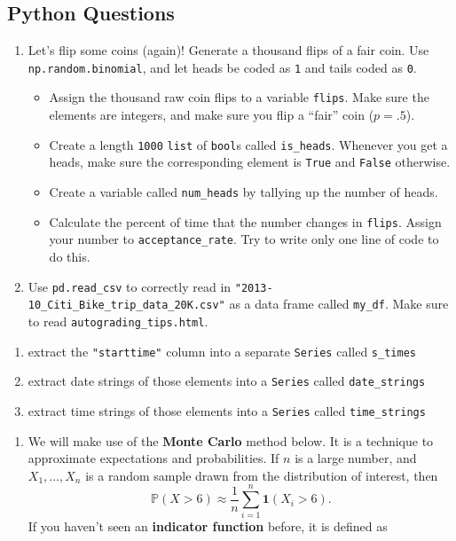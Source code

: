 \documentclass[
  12pt,
  krantz2]{krantz}
\providecommand{\tightlist}{%
  \setlength{\itemsep}{0pt}\setlength{\parskip}{0pt}}
\begin{document}
\hypertarget{python-questions-1}{%
\subsection{Python Questions}\label{python-questions-1}}

\begin{enumerate}
\def\labelenumi{\arabic{enumi}.}
\item
  Let's flip some coins (again)! Generate a thousand flips of a fair coin. Use \texttt{np.random.binomial}, and let heads be coded as \texttt{1} and tails coded as \texttt{0}.

  \begin{itemize}
  \tightlist
  \item
    Assign the thousand raw coin flips to a variable \texttt{flips}. Make sure the elements are integers, and make sure you flip a ``fair'' coin (\(p=.5\)).
  \item
    Create a length \texttt{1000} \texttt{list} of \texttt{bool}s called \texttt{is\_heads}. Whenever you get a heads, make sure the corresponding element is \texttt{True} and \texttt{False} otherwise.
  \item
    Create a variable called \texttt{num\_heads} by tallying up the number of heads.
  \item
    Calculate the percent of time that the number changes in \texttt{flips}. Assign your number to \texttt{acceptance\_rate}. Try to write only one line of code to do this.
  \end{itemize}
\item
  Use \texttt{pd.read\_csv} to correctly read in \texttt{"2013-10\_Citi\_Bike\_trip\_data\_20K.csv"} as a data frame called \texttt{my\_df}. Make sure to read \texttt{autograding\_tips.html}.
\end{enumerate}

\begin{enumerate}
\def\labelenumi{\alph{enumi}.}
\item
  extract the \texttt{"starttime"} column into a separate \texttt{Series} called \texttt{s\_times}
\item
  extract date strings of those elements into a \texttt{Series} called \texttt{date\_strings}
\item
  extract time strings of those elements into a \texttt{Series} called \texttt{time\_strings}
\end{enumerate}

\begin{enumerate}
\def\labelenumi{\arabic{enumi}.}
\setcounter{enumi}{2}
\tightlist
\item
  We will make use of the \textbf{Monte Carlo} \citep{monte-carlo-stat-methods} method below. It is a technique to approximate expectations and probabilities. If \(n\) is a large number, and \(X_1, \ldots, X_n\) is a random sample drawn from the distribution of interest, then
  \begin{equation} 
  \mathbb{P}(X > 6) \approx \frac{1}{n}\sum_{i=1}^n \mathbf{1}(X_i > 6).
  \end{equation}
  If you haven't seen an \textbf{indicator function} before, it is defined as
\end{enumerate}
\end{document}
